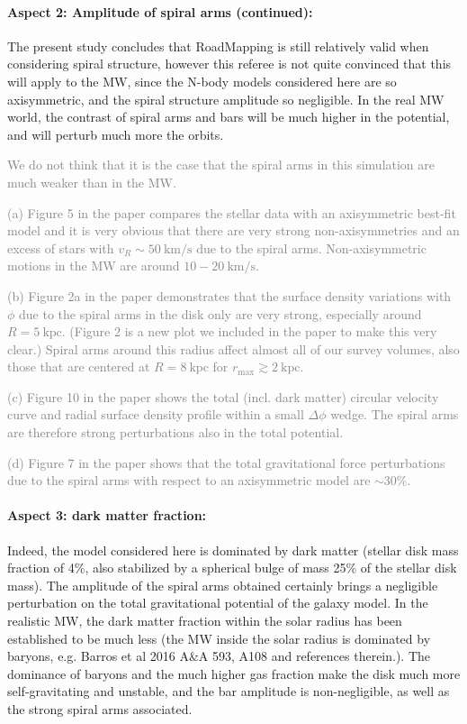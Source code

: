 \documentclass[10pt,a4paper]{article}
\newcommand{\Answer}[1]{\textcolor{Gray}{#1}}
\begin{document}
\paragraph{Aspect 2: Amplitude of spiral arms (continued):} The present study concludes that RoadMapping is still relatively valid when considering spiral structure, however this referee is not quite convinced that this
will apply to the MW, since the N-body models considered here are so axisymmetric,
and the spiral structure amplitude so negligible. In the real MW world, the contrast
of spiral arms and bars will be much higher in the potential, and will perturb much
more the orbits.  

\Answer{We do not think that it is the case that the spiral arms in this simulation are much weaker than in the MW.}

\Answer{(a) Figure 5 in the paper compares the stellar data with an axisymmetric best-fit model and it is very obvious that there are very strong non-axisymmetries and an excess of stars with $v_R\sim 50~\text{km/s}$ due to the spiral arms. Non-axisymmetric motions in the MW are around $10-20~\text{km/s}$.}

\Answer{(b) Figure 2a in the paper demonstrates that the surface density variations with $\phi$ due to the spiral arms in the disk only are very strong, especially around $R=5~\text{kpc}$. (Figure 2 is a new plot we included in the paper to make this very clear.) Spiral arms around this radius affect almost all of our survey volumes, also those that are centered at $R=8~\text{kpc}$ for $r_\text{max}\gtrsim2~\text{kpc}$.}

\Answer{(c) Figure 10 in the paper shows the total (incl. dark matter) circular velocity curve and radial surface density profile within a small $\Delta \phi$ wedge. The spiral arms are therefore strong perturbations also in the total potential.}

\Answer{(d) Figure 7 in the paper shows that the total gravitational force perturbations due to the spiral arms with respect to an axisymmetric model are $\sim30\%$.}

\paragraph{Aspect 3: dark matter fraction:} Indeed, the model considered here is dominated by dark matter (stellar disk mass fraction of 4\%, also stabilized by a spherical bulge of mass 25\% of the stellar disk mass). The amplitude of the spiral arms obtained certainly brings a negligible
perturbation on the total gravitational potential of the galaxy model. In the
realistic MW, the dark matter fraction within the solar radius has been established
to be much less (the MW inside the solar radius is dominated by baryons, e.g. Barros
et al 2016 A\&A 593, A108 and references therein.). The dominance of baryons and the
much higher gas fraction make the disk much more self-gravitating and unstable, and
the bar amplitude is non-negligible, as well as the strong spiral arms associated.
\end{document}
